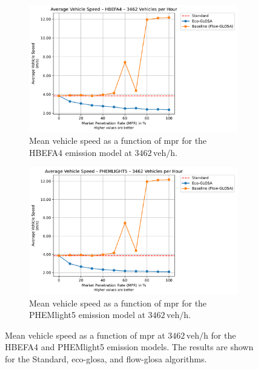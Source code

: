 \begin{figure}[htb]
  \centering
  \begin{subfigure}[b]{0.49\textwidth}
    \includegraphics[width=\textwidth]{data/img/AverageVehicleSpeed/AverageVehicleSpeed_HBEFA4_Cars3462.pdf}
    \caption{Mean vehicle speed as a function of \ac{mpr} for the HBEFA4 emission model at $3462\,\mathrm{veh/h}$.}
    \label{fig:MeanSpeed_HBEFA4_3462}
  \end{subfigure}\hfill
  \begin{subfigure}[b]{0.49\textwidth}
    \includegraphics[width=\textwidth]{data/img/AverageVehicleSpeed/AverageVehicleSpeed_PHEMLIGHT5_Cars3462.pdf}
    \caption{Mean vehicle speed as a function of \ac{mpr} for the PHEMlight5 emission model at $3462\,\mathrm{veh/h}$.}
    \label{fig:MeanSpeed_PHEM_3462}
  \end{subfigure}
  \caption{Mean vehicle speed as a function of \ac{mpr} at $3462\,\mathrm{veh/h}$ for the HBEFA4 and PHEMlight5 emission models. The results are shown for the Standard, \ac{eco-glosa}, and \ac{flow-glosa} algorithms.}
  \label{fig:MeanSpeed_3462}
\end{figure}


